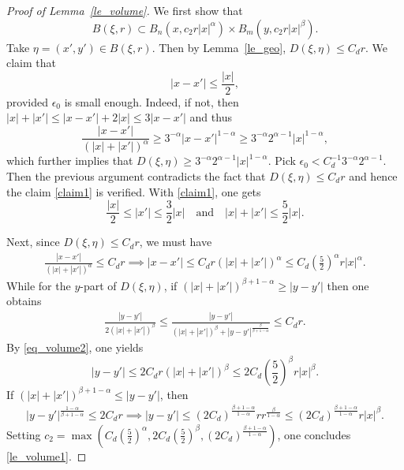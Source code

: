 \documentclass[12pt]{amsart}
\theoremstyle{plain}
\theoremstyle{definition}
\numberwithin{equation}{section}
\begin{document}
\begin{proof}[Proof of Lemma~\ref{le_volume}]
We first show that 
\begin{equation}\label{le_volume1}
    B(\xi, r) \subset B_n(x, c_2 r |x|^\alpha) \times B_m(y, c_2 r |x|^\beta).
\end{equation}
Take $\eta = (x',y')\in B(\xi, r)$. Then by Lemma~\ref{le_geo}, $D(\xi,\eta)\le C_d r$. We claim that
\begin{equation}\label{claim1}
    |x-x'| \le \frac{|x|}{2},
\end{equation}
provided $\epsilon_0$ is small enough. Indeed, if not, then $|x|+|x'|\le |x-x'| + 2|x| \le 3|x-x'|$ and thus
\begin{equation*}
    \frac{|x-x'|}{\left(|x|+|x'|\right)^\alpha} \ge 3^{-\alpha} |x-x'|^{1-\alpha} \ge 3^{-\alpha} 2^{\alpha-1} |x|^{1-\alpha},
\end{equation*}
which further implies that $D(\xi,\eta)\ge 3^{-\alpha} 2^{\alpha-1} |x|^{1-\alpha}$. Pick $\epsilon_0 < C_d^{-1} 3^{-\alpha} 2^{\alpha-1}$. Then the previous argument contradicts the fact that $D(\xi,\eta)\le C_d r$ and hence the claim \eqref{claim1} is verified. With \eqref{claim1}, one gets
\begin{equation}\label{eq_volume2}
    \frac{|x|}{2} \le |x'| \le \frac{3}{2}|x|\quad \textrm{and}\quad |x|+|x'| \le \frac{5}{2} |x|.
\end{equation}

Next, since $D(\xi,\eta)\le C_d r$, we must have
\begin{align*}
    \frac{|x-x'|}{\left(|x|+|x'|\right)^\alpha} \le C_d r \implies |x-x'|\le C_d r \left(|x|+|x'|\right)^\alpha \le C_d \left(\frac{5}{2}\right)^\alpha r |x|^\alpha.
\end{align*}
While for the $y$-part of $D(\xi,\eta)$, if $\left(|x|+|x'|\right)^{\beta+1-\alpha}\ge |y-y'|$ then one obtains
\begin{align*}
\frac{|y-y'|}{2\left(|x|+|x'|\right)^{\beta}} \le \frac{|y-y'|}{\left(|x|+|x'|\right)^{\beta} + |y-y'|^{\frac{\beta}{\beta+1-\alpha}}} \le C_d r.
\end{align*}
By \eqref{eq_volume2}, one yields
\begin{equation*}
    |y-y'|\le 2C_d r \left(|x|+|x'|\right)^{\beta} \le 2C_d \left(\frac{5}{2}\right)^\beta r |x|^\beta.
\end{equation*}
If $\left(|x|+|x'|\right)^{\beta+1-\alpha}\le |y-y'|$, then
\begin{align*}
|y-y'|^{\frac{1-\alpha}{\beta+1-\alpha}} \le 2 C_d r \implies |y-y'|\le \left(2C_d\right)^{\frac{\beta+1-\alpha}{1-\alpha}} r r^{\frac{\beta}{1-\alpha}}\le \left(2C_d\right)^{\frac{\beta+1-\alpha}{1-\alpha}} r |x|^{\beta}.
\end{align*}
Setting $c_2 = \max \left( C_d \left(\frac{5}{2}\right)^\alpha,  2C_d \left(\frac{5}{2}\right)^\beta, \left(2C_d\right)^{\frac{\beta+1-\alpha}{1-\alpha}} \right)$, one concludes \eqref{le_volume1}.


\end{proof}
\end{document}
